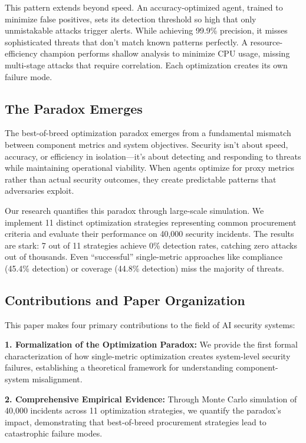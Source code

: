 \documentclass[10pt,conference]{IEEEtran}
\begin{document}
This pattern extends beyond speed. An accuracy-optimized agent, trained to minimize false positives, sets its detection threshold so high that only unmistakable attacks trigger alerts. While achieving 99.9\% precision, it misses sophisticated threats that don't match known patterns perfectly. A resource-efficiency champion performs shallow analysis to minimize CPU usage, missing multi-stage attacks that require correlation. Each optimization creates its own failure mode.

\subsection{The Paradox Emerges}

The best-of-breed optimization paradox emerges from a fundamental mismatch between component metrics and system objectives. Security isn't about speed, accuracy, or efficiency in isolation---it's about detecting and responding to threats while maintaining operational viability. When agents optimize for proxy metrics rather than actual security outcomes, they create predictable patterns that adversaries exploit.

Our research quantifies this paradox through large-scale simulation. We implement 11 distinct optimization strategies representing common procurement criteria and evaluate their performance on 40,000 security incidents. The results are stark: 7 out of 11 strategies achieve 0\% detection rates, catching zero attacks out of thousands. Even ``successful'' single-metric approaches like compliance (45.4\% detection) or coverage (44.8\% detection) miss the majority of threats.

\subsection{Contributions and Paper Organization}

This paper makes four primary contributions to the field of AI security systems:

\textbf{1. Formalization of the Optimization Paradox:} We provide the first formal characterization of how single-metric optimization creates system-level security failures, establishing a theoretical framework for understanding component-system misalignment.

\textbf{2. Comprehensive Empirical Evidence:} Through Monte Carlo simulation of 40,000 incidents across 11 optimization strategies, we quantify the paradox's impact, demonstrating that best-of-breed procurement strategies lead to catastrophic failure modes.
\end{document}
